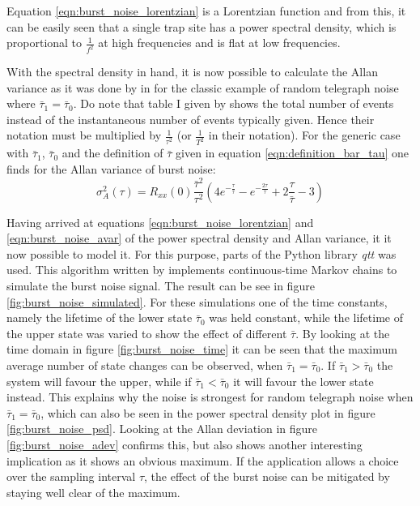 Equation \ref{eqn:burst_noise_lorentzian} is a Lorentzian function and from this, it can be easily seen that a single trap site has a power spectral density, which is proportional to $\frac{1}{f^2}$ at high frequencies and is flat at low frequencies.

With the spectral density in hand, it is now possible to calculate the Allan variance as it was done by \citeauthor{allen_dev_flicker} in \cite{allen_dev_flicker} for the classic example of random telegraph noise where $\bar \tau_1 = \bar \tau_0$. Do note that table I given by \citeauthor{allen_dev_flicker} shows the total number of events instead of the instantaneous number of events typically given. Hence their notation must be multiplied by $\frac{1}{\tau^2}$ (or $\frac{1}{T^2}$ in their notation). For the generic case with $\bar \tau_1$, $\bar \tau_0$ and the definition of $\bar \tau$ given in equation \ref{eqn:definition_bar_tau} one finds for the Allan variance of burst noise:
\begin{equation}
    \sigma^2_A(\tau) = R_{xx}(0) \frac{\bar \tau^2}{\tau^2} \left(4 e^{-\frac{\tau}{\bar \tau}} - e^{-\frac{2 \tau}{\bar \tau}} + 2 \frac{\tau}{\bar \tau} - 3 \right) \label{eqn:burst_noise_avar}
\end{equation}

Having arrived at equations \ref{eqn:burst_noise_lorentzian} and \ref{eqn:burst_noise_avar} of the power spectral density and Allan variance, it it now possible to model it. For this purpose, parts of the Python library \textit{qtt} \cite{qtt} was used. This algorithm written by \citeauthor{qtt} implements continuous-time Markov chains to simulate the burst noise signal. The result can be see in figure \ref{fig:burst_noise_simulated}. For these simulations one of the time constants, namely the lifetime of the lower state $\bar \tau_0$ was held constant, while the lifetime of the upper state was varied to show the effect of different $\bar \tau$. By looking at the time domain in figure \ref{fig:burst_noise_time} it can be seen that the maximum average number of state changes can be observed, when $\bar \tau_1 = \bar \tau_0$. If $\bar \tau_1 > \bar \tau_0$ the system will favour the upper, while if $\bar \tau_1 < \bar \tau_0$ it will favour the lower state instead. This explains why the noise is strongest for random telegraph noise when $\bar \tau_1 = \bar \tau_0$, which can also be seen in the power spectral density plot in figure \ref{fig:burst_noise_psd}. Looking at the Allan deviation in figure \ref{fig:burst_noise_adev} confirms this, but also shows another interesting implication as it shows an obvious maximum. If the application allows a choice over the sampling interval $\tau$, the effect of the burst noise can be mitigated by staying well clear of the maximum.

